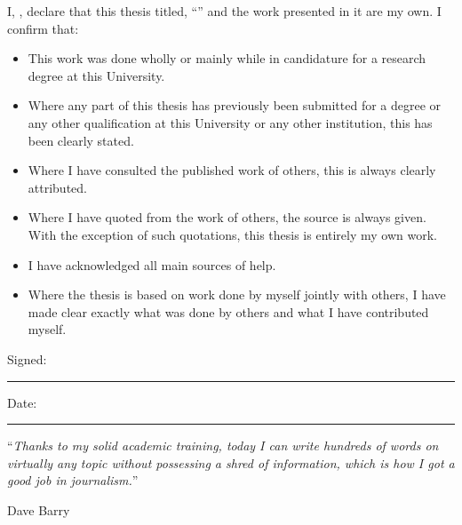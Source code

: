 
\begin{declaration}
  \addchaptertocentry{\authorshipname} %
  \noindent I, \authorname, declare that this thesis titled, \enquote{\ttitle} and the work presented in it are my own. I confirm that:
  
  \begin{itemize} 
    \item This work was done wholly or mainly while in candidature for a research degree at this University.
    \item Where any part of this thesis has previously been submitted for a degree or any other qualification at this University or any other institution, this has been clearly stated.
    \item Where I have consulted the published work of others, this is always clearly attributed.
    \item Where I have quoted from the work of others, the source is always given. With the exception of such quotations, this thesis is entirely my own work.
    \item I have acknowledged all main sources of help.
    \item Where the thesis is based on work done by myself jointly with others, I have made clear exactly what was done by others and what I have contributed myself.\\
  \end{itemize}
  
  \noindent Signed:\\
  \rule[0.5em]{25em}{0.5pt} %
  
  \noindent Date:\\
  \rule[0.5em]{25em}{0.5pt} %
\end{declaration}

\cleardoublepage


\vspace*{0.2\textheight}

\noindent\enquote{\itshape Thanks to my solid academic training, today I can write hundreds of words on virtually any topic without possessing a shred of information, which is how I got a good job in journalism.}\bigbreak

\hfill Dave Barry